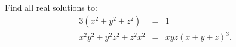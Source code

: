 Find all real solutions to: \begin{eqnarray*} 3(x^2 + y^2 + z^2) &=& 1 \\ x^2y^2 + y^2z^2 + z^2x^2 &=& xyz(x + y + z)^3. \end{eqnarray*}